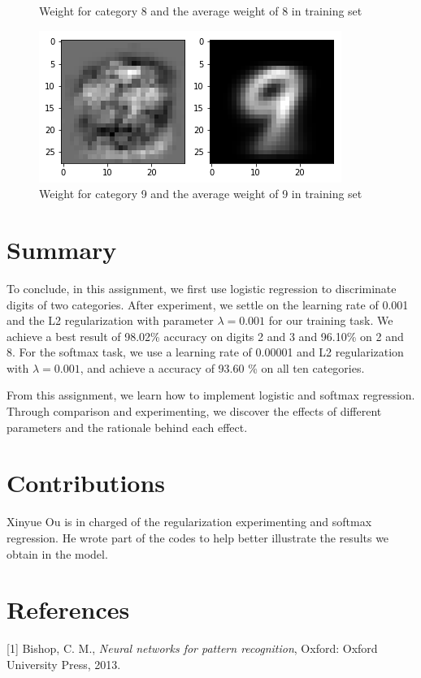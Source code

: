 \documentclass{article}
\begin{document}
\begin{figure}[thbp]
\begin{minipage}{0.48\textwidth}
		\caption{Weight for category 8 and the average weight of 8 in training set}
	\end{minipage}\hfill
	\begin {minipage}{0.48\textwidth}
	\centering
	\includegraphics[width=\textwidth]{pics/9.png}
	\caption{Weight for category 9 and the average weight of 9 in training set}
\end{minipage}
\end{figure}


\section{Summary}
To conclude, in this assignment, we first use logistic regression to discriminate digits of two categories. After experiment, we settle on the learning rate of 0.001 and the L2 regularization with parameter $\lambda = 0.001$ for our training task. We achieve a best result of 98.02\% accuracy on digits 2 and 3 and 96.10\% on 2 and 8. For the softmax task, we use a learning rate of 0.00001 and L2 regularization with  $\lambda = 0.001$, and achieve a accuracy of 93.60 \% on all ten categories.

From this assignment, we learn how to implement logistic and softmax regression. Through comparison and experimenting, we discover the effects of different parameters and the rationale behind each effect. 
\section{Contributions}


Xinyue Ou is in charged of the regularization experimenting and softmax regression. He wrote part of the codes to help better illustrate the results we obtain in the model.
\section{References}
[1] Bishop, C. M., {\it Neural networks for pattern recognition}, Oxford: Oxford University Press, 2013.
\end{document}
